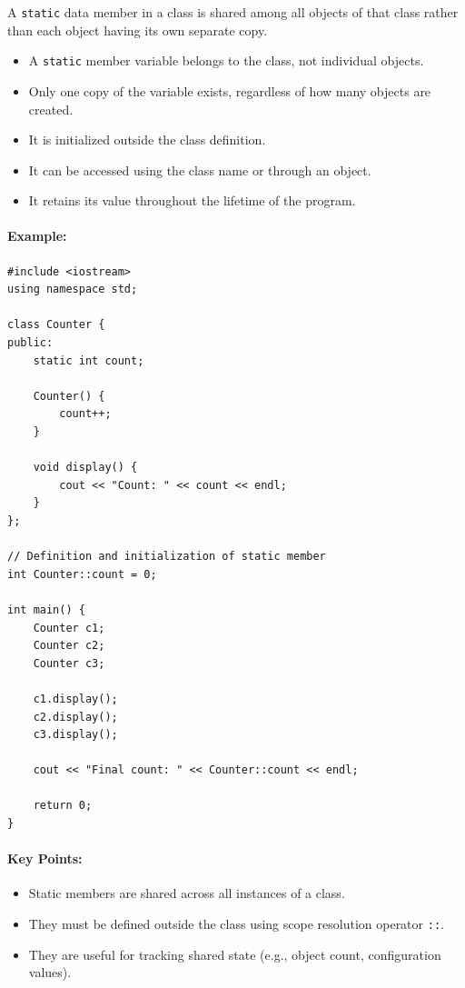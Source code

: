 \documentclass[10pt]{article}
\begin{document}
A \verb|static| data member in a class is shared among all objects of that class rather than each object having its own separate copy.

\begin{itemize}
    \item A \verb|static| member variable belongs to the class, not individual objects.
    \item Only one copy of the variable exists, regardless of how many objects are created.
    \item It is initialized outside the class definition.
    \item It can be accessed using the class name or through an object.
    \item It retains its value throughout the lifetime of the program.
\end{itemize}

\paragraph{Example:}

\begin{verbatim}
#include <iostream>
using namespace std;

class Counter {
public:
    static int count;

    Counter() {
        count++;
    }

    void display() {
        cout << "Count: " << count << endl;
    }
};

// Definition and initialization of static member
int Counter::count = 0;

int main() {
    Counter c1;
    Counter c2;
    Counter c3;

    c1.display();
    c2.display();
    c3.display();

    cout << "Final count: " << Counter::count << endl;

    return 0;
}
\end{verbatim}

\paragraph{Key Points:}

\begin{itemize}
    \item Static members are shared across all instances of a class.
    \item They must be defined outside the class using scope resolution operator \verb|::|.
    \item They are useful for tracking shared state (e.g., object count, configuration values).
\end{itemize}
\end{document}
